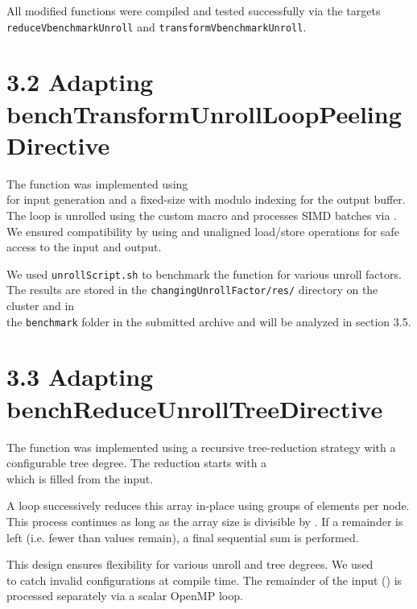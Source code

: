 All modified functions were compiled and tested successfully via the targets \\
\texttt{reduceVbenchmarkUnroll} and \texttt{transformVbenchmarkUnroll}.

\pagebreak

\section*{3.2 Adapting benchTransformUnrollLoopPeelingDirective}

The function  was implemented using \\
 for input generation and a fixed-size  with modulo indexing for the output buffer.
The loop is unrolled using the custom  macro and processes SIMD batches via .
We ensured compatibility by using  and unaligned load/store operations for safe access to the input and output.

We used \texttt{unrollScript.sh} to benchmark the function for various unroll factors. The results are stored in the \texttt{changingUnrollFactor/res/} directory on the cluster and in \\
the \texttt{benchmark} folder in the submitted archive and will be analyzed in section 3.5.

\pagebreak

\section*{3.3 Adapting benchReduceUnrollTreeDirective}

The function  was implemented using a recursive tree-reduction strategy with a configurable tree degree.
The reduction starts with a \\
 which is filled from the  input.

A loop successively reduces this array in-place using groups of  elements per node.
This process continues as long as the array size is divisible by . 
If a remainder is left (i.e. fewer than  values remain), a final sequential sum is performed.

This design ensures flexibility for various unroll and tree degrees. We used \\ 
 to catch invalid configurations at compile time.
The remainder of the input () is processed separately via a scalar OpenMP loop.

